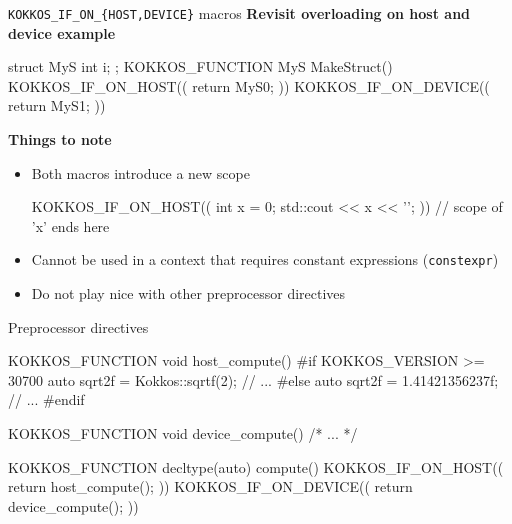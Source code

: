 
\begin{frame}[fragile]{\texttt{KOKKOS\_IF\_ON\_\{HOST,DEVICE\}} macros}
\textbf{Revisit overloading on host and device example}
\begin{code}[keywords={KOKKOS_IF_ON_HOST,KOKKOS_IF_ON_DEVICE}]
struct MyS { int i; };
KOKKOS_FUNCTION MyS MakeStruct() {
  KOKKOS_IF_ON_HOST(( return MyS{0}; ))
  KOKKOS_IF_ON_DEVICE(( return MyS{1}; ))
}
\end{code}

\textbf{Things to note}
\begin{itemize}
\item Both macros introduce a new scope
\begin{code}[keywords={KOKKOS_IF_ON_HOST}]
  KOKKOS_IF_ON_HOST((
    int x = 0;
    std::cout << x << '\n';
  )) // scope of 'x' ends here
\end{code}
\item Cannot be used in a context that requires constant expressions (\texttt{constexpr})
\item Do not play nice with other preprocessor directives
\end{itemize}

\end{frame}


\begin{frame}[fragile]{Preprocessor directives}

\begin{code}[keywords={KOKKOS_IF_ON_HOST,KOKKOS_IF_ON_DEVICE}]

KOKKOS_FUNCTION void host_compute() {
#if KOKKOS_VERSION >= 30700
  auto sqrt2f = Kokkos::sqrtf(2);
  // ...
#else
  auto sqrt2f = 1.41421356237f;
  // ...
#endif
}

KOKKOS_FUNCTION void device_compute() { /* ... */ }

KOKKOS_FUNCTION decltype(auto) compute() {
  KOKKOS_IF_ON_HOST(( return host_compute(); ))
  KOKKOS_IF_ON_DEVICE(( return device_compute(); ))
}
\end{code}

\end{frame}


